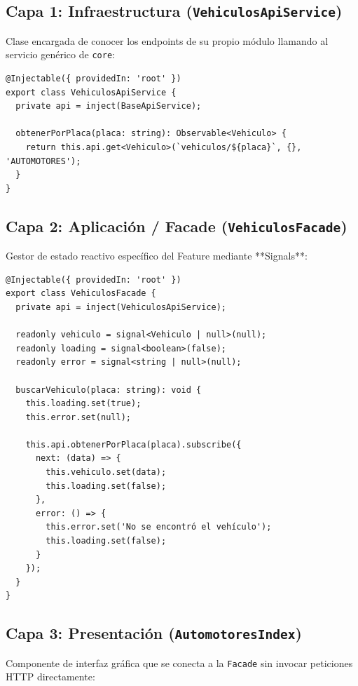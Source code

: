 \documentclass[12pt,a4paper]{article}
\begin{document}
\subsection{Capa 1: Infraestructura (\texttt{VehiculosApiService})}

Clase encargada de conocer los endpoints de su propio módulo llamando al servicio genérico de \texttt{core}:

\begin{lstlisting}[caption={Infraestructura: VehiculosApiService}]
@Injectable({ providedIn: 'root' })
export class VehiculosApiService {
  private api = inject(BaseApiService);

  obtenerPorPlaca(placa: string): Observable<Vehiculo> {
    return this.api.get<Vehiculo>(`vehiculos/${placa}`, {}, 'AUTOMOTORES');
  }
}
\end{lstlisting}

\subsection{Capa 2: Aplicación / Facade (\texttt{VehiculosFacade})}

Gestor de estado reactivo específico del Feature mediante **Signals**:

\begin{lstlisting}[caption={Aplicación: VehiculosFacade}]
@Injectable({ providedIn: 'root' })
export class VehiculosFacade {
  private api = inject(VehiculosApiService);

  readonly vehiculo = signal<Vehiculo | null>(null);
  readonly loading = signal<boolean>(false);
  readonly error = signal<string | null>(null);

  buscarVehiculo(placa: string): void {
    this.loading.set(true);
    this.error.set(null);

    this.api.obtenerPorPlaca(placa).subscribe({
      next: (data) => {
        this.vehiculo.set(data);
        this.loading.set(false);
      },
      error: () => {
        this.error.set('No se encontró el vehículo');
        this.loading.set(false);
      }
    });
  }
}
\end{lstlisting}

\subsection{Capa 3: Presentación (\texttt{AutomotoresIndex})}

Componente de interfaz gráfica que se conecta a la \texttt{Facade} sin invocar peticiones HTTP directamente:
\end{document}
